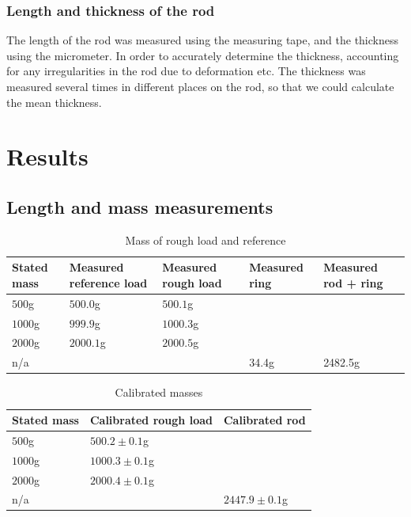 \documentclass[11pt,a4paper]{article}
\begin{document}
        \subsubsection{Length and thickness of the rod}
          The length of the rod was measured using the measuring tape, and the thickness using the micrometer. In order to accurately determine the thickness, accounting for any irregularities in the rod due to deformation etc. The thickness was measured several times in different places on the rod, so that we could calculate the mean thickness.



\section{\label{sect:results}Results}
  
  \subsection{Length and mass measurements}
    
    \begin{table}[H]
      \center
      \caption{Mass of rough load and reference}
      \begin{tabular}{ | l | l | l | l | l |}
        \hline
        Stated mass   & Measured reference load   & Measured rough load & Measured ring & Measured rod + ring \\ \hline
        $500$g        & $500.0$g             & $500.1$g &   &  \\ \hline
        $1000$g       & $999.9$g             & $1000.3$g &  &  \\ \hline
        $2000$g       & $2000.1$g            & $2000.5$g &  &  \\ \hline
        n/a           &  &  & 34.4g & 2482.5g
        \\ \hline
      \end{tabular}
      \label{tab:masses}
    \end{table}

    \begin{table}[H]
      \center
      \caption{Calibrated masses}
      \begin{tabular}{ | l | l | l |}
        \hline
        Stated mass & Calibrated rough load & Calibrated rod \\ \hline
        $500$g  & $500.2\pm 0.1$g  &  \\ \hline
        $1000$g &$1000.3\pm 0.1$g  &  \\ \hline
        $2000$g &$2000.4\pm 0.1$g  &  \\ \hline
        n/a     &            & $2447.9\pm 0.1$g
        \\ \hline
      \end{tabular}
      \label{tab:masses_calibrated}
    \end{table}
\end{document}
